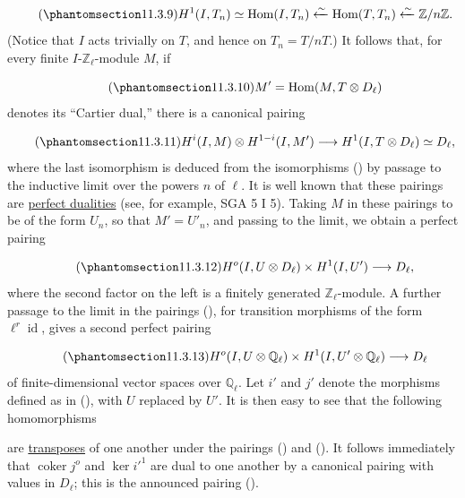 \begin{equation}\tag{\SGARefTarget{sga7.sga7i.eix.n11-3-9}{11.3.9}}
H^1(I,T_n)\simeq\operatorname{Hom}(I,T_n)
 \xleftarrow{\sim}\operatorname{Hom}(T,T_n)
 \xleftarrow{\sim}\mathbb Z/n\mathbb Z.
\end{equation}
(Notice that $I$ acts trivially on $T$, and hence on $T_n=T/nT$.) It
follows that, for every finite $I$-$\mathbb Z_\ell$-module $M$, if

\begin{equation}\tag{\SGARefTarget{sga7.sga7i.eix.n11-3-10}{11.3.10}}
M'=\operatorname{Hom}(M,T\otimes D_\ell)
\end{equation}
denotes its ``Cartier dual,'' there is a canonical pairing

\begin{equation}\tag{\SGARefTarget{sga7.sga7i.eix.n11-3-11}{11.3.11}}
H^i(I,M)\otimes H^{1-i}(I,M')
 \longrightarrow H^1(I,T\otimes D_\ell)\simeq D_\ell,
\end{equation}
where the last isomorphism is deduced from the isomorphisms () by
passage to the inductive limit over the powers $n$ of $\ell$. It is well
known that these pairings are \underline{perfect dualities} (see, for
example, SGA 5 I 5). Taking $M$ in these pairings to be of the form
$U_n$, so that $M'=U'_n$, and passing to the limit, we obtain a perfect
pairing

\begin{equation}\tag{\SGARefTarget{sga7.sga7i.eix.n11-3-12}{11.3.12}}
H^o(I,U\otimes D_\ell)\times H^1(I,U')\longrightarrow D_\ell,
\end{equation}
where the second factor on the left is a finitely generated
$\mathbb Z_\ell$-module. A further passage to the limit in the pairings
(), for transition morphisms of the form
$\ell^r\operatorname{id}$, gives a second perfect pairing

\begin{equation}\tag{\SGARefTarget{sga7.sga7i.eix.n11-3-13}{11.3.13}}
H^o(I,U\otimes\mathbb Q_\ell)
 \times H^1(I,U'\otimes\mathbb Q_\ell)
 \longrightarrow D_\ell
\end{equation}
of finite-dimensional vector spaces over $\mathbb Q_\ell$. Let $i'$ and
$j'$ denote the morphisms defined as in (), with $U$ replaced by
$U'$. It is then easy to see that the following homomorphisms

\begin{center}
\end{center}
are \underline{transposes} of one another under the pairings ()
and (). It follows immediately that
$\operatorname{coker}j^o$ and $\ker {i'}^1$ are dual to one another by a
canonical pairing with values in $D_\ell$; this is the announced pairing
().
